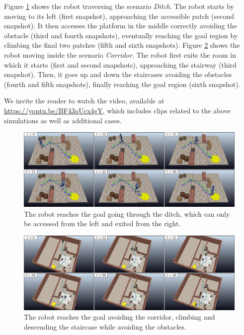 Figure \ref{fig:WoS:offlineCase:Ditch:Snapshots} shows the robot traversing the
scenario \textit{Ditch}. The robot starts by moving to its left (first
snapshot), approaching the accessible patch (second snapshot). It then accesses
the platform in the middle correctly avoiding the obstacle (third and fourth
snapshots), eventually reaching the goal region by climbing the final two
patches (fifth and sixth snapshots).
Figure \ref{fig:WoS:offlineCase:Corridor:Snapshots} shows the robot moving
inside the scenario \textit{Corridor}. The robot first exits the room in which
it starts (first and second snapshots), approaching the stairway (third
snapshot). Then, it goes up and down the staircases avoiding the obstacles
(fourth and fifth snapshots), finally reaching the goal region (sixth snapshot).

We invite the reader to watch the video, available at
\url{https://youtu.be/BF43qUcx4gY}, which includes 
clips related to the above simulations as well as additional cases.

\begin{figure}
    \centering
    \includegraphics[width=\textwidth]{figures/OfflineDitch.jpeg}
    \caption{The robot reaches the goal going through the ditch, which can only
        be accessed from the left and exited from the right.}
    \label{fig:WoS:offlineCase:Ditch:Snapshots}
\end{figure}
\begin{figure}
    \centering
    \includegraphics[width=\textwidth]{figures/OfflineCorridor.jpeg}
    \caption{The robot reaches the goal avoiding the
    corridor, climbing and descending the staircase while
    avoiding the obstacles.}
    \label{fig:WoS:offlineCase:Corridor:Snapshots}
\end{figure}


